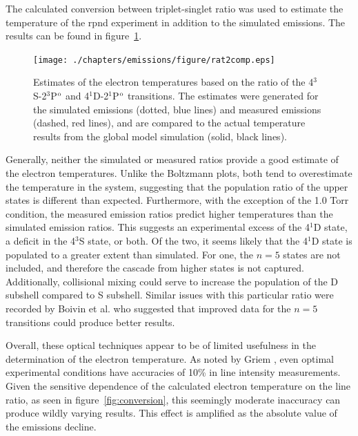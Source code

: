 The calculated conversion between triplet-singlet ratio was used to estimate the
temperature of the \acs{rpnd} experiment in addition to the simulated emissions.
The results can be found in figure~\ref{fig:rat2comp}.
\begin{figure}
  \centering
  \texttt{[image: ./chapters/emissions/figure/rat2comp.eps]}
  \caption{Estimates of the electron temperatures based on the ratio of the
    4$^3$S-2$^3$P$^\mathrm{o}$ and 4$^1$D-2$^1$P$^\mathrm{o}$ transitions. The estimates were
    generated for the simulated emissions (dotted, blue lines) and measured
    emissions (dashed, red lines), and are compared to the actual temperature
    results from the global model simulation (solid, black lines).}
  \label{fig:rat2comp}
\end{figure}
Generally, neither the simulated or measured ratios provide a good estimate of
the electron temperatures. Unlike the Boltzmann plots, both tend to overestimate
the temperature in the system, suggesting that the population ratio of the upper
states is different than expected. Furthermore, with the exception of the 1.0
Torr condition, the measured emission ratios predict higher temperatures than
the simulated emission ratios. This suggests an experimental excess of the
4$^1$D state, a deficit in the 4$^3$S state, or both. Of the two, it seems
likely that the 4$^1$D state is populated to a greater extent than simulated.
For one, the $n=5$ states are not included, and therefore the cascade from
higher states is not captured. Additionally, collisional mixing could serve to
increase the population of the D subshell compared to S subshell. Similar issues
with this particular ratio were recorded by Boivin et al. \cite{Boivin2007} who
suggested that improved data for the $n=5$ transitions could produce better
results.

Overall, these optical techniques appear to be of limited usefulness in the
determination of the electron temperature. As noted by Griem \cite{Griem2005},
even optimal experimental conditions have accuracies of 10\% in line intensity
measurements. Given the sensitive dependence of the calculated electron
temperature on the line ratio, as seen in figure~\ref{fig:conversion}, this
seemingly moderate inaccuracy can produce wildly varying results. This effect is
amplified as the absolute value of the emissions decline.

